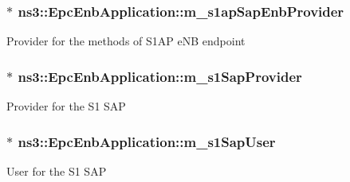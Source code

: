 \subsubsection[{\texorpdfstring{m\+\_\+s1ap\+Sap\+Enb\+Provider}{m_s1apSapEnbProvider}}]{$\ast$ ns3\+::\+Epc\+Enb\+Application\+::m\+\_\+s1ap\+Sap\+Enb\+Provider\hspace{0.3cm}{\ttfamily [private]}}\hypertarget{classns3_1_1EpcEnbApplication_aea4917aa066399d72225c3408772020f}{}\label{classns3_1_1EpcEnbApplication_aea4917aa066399d72225c3408772020f}
Provider for the methods of S1\+AP e\+NB endpoint 
\subsubsection[{\texorpdfstring{m\+\_\+s1\+Sap\+Provider}{m_s1SapProvider}}]{$\ast$ ns3\+::\+Epc\+Enb\+Application\+::m\+\_\+s1\+Sap\+Provider\hspace{0.3cm}{\ttfamily [private]}}\hypertarget{classns3_1_1EpcEnbApplication_ad7e9b81b4168a86e856cbc8b4ae55dae}{}\label{classns3_1_1EpcEnbApplication_ad7e9b81b4168a86e856cbc8b4ae55dae}
Provider for the S1 S\+AP 
\subsubsection[{\texorpdfstring{m\+\_\+s1\+Sap\+User}{m_s1SapUser}}]{$\ast$ ns3\+::\+Epc\+Enb\+Application\+::m\+\_\+s1\+Sap\+User\hspace{0.3cm}{\ttfamily [private]}}\hypertarget{classns3_1_1EpcEnbApplication_aaafcd864038cc863330565126353c521}{}\label{classns3_1_1EpcEnbApplication_aaafcd864038cc863330565126353c521}
User for the S1 S\+AP 
